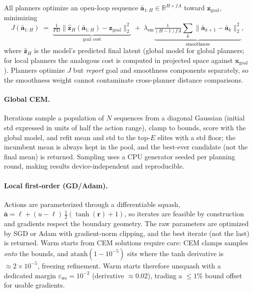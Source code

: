 \documentclass[11pt,a4paper]{article}
\newcommand{\zlat}{\mathbf{z}}
\newcommand{\xloc}{\mathbf{x}}
\newcommand{\abar}{\bar{\mathbf{a}}}
\begin{document}
All planners optimize an open-loop sequence
$\abar_{1:H} \in \mathbb{R}^{H \times fA}$ toward
$\zlat_{\mathrm{goal}}$, minimizing
\begin{equation}
J(\abar_{1:H}) \;=\;
\underbrace{\tfrac{1}{PD}\lVert \hat{\zlat}_H(\abar_{1:H}) - \zlat_{\mathrm{goal}} \rVert_2^2}_{\text{goal cost}}
\;+\; \lambda_{\mathrm{sm}}
\underbrace{\tfrac{1}{(H-1)fA}\textstyle\sum_{k} \lVert \abar_{k+1}-\abar_k \rVert_2^2}_{\text{smoothness}} ,
\label{eq:objective}
\end{equation}
where $\hat{\zlat}_H$ is the model's predicted final latent (global model for
global planners; for local planners the analogous cost is computed in
projected space against $\xloc_{\mathrm{goal}}$). Planners optimize
$J$ but \emph{report} goal and smoothness components separately, so the
smoothness weight cannot contaminate cross-planner distance comparisons.

\paragraph{Global CEM.} Iterations sample a population of $N$ sequences from a
diagonal Gaussian (initial std expressed in units of half the action range),
clamp to bounds, score with the global model, and refit mean and std to the
top-$E$ elites with a std floor; the incumbent mean is always kept in the
pool, and the best-ever candidate (not the final mean) is returned. Sampling
uses a CPU generator seeded per planning round, making results
device-independent and reproducible.

\paragraph{Local first-order (GD/Adam).} Actions are parameterized through a
differentiable squash,
$\abar = \ell + (u-\ell)\,\tfrac{1}{2}(\tanh(\mathbf{r})+1)$, so iterates are
feasible by construction and gradients respect the boundary geometry. The raw
parameters are optimized by SGD or Adam with gradient-norm clipping, and the
best iterate (not the last) is returned. Warm starts from CEM solutions
require care: CEM clamps samples \emph{onto} the bounds, and
$\mathrm{atanh}(1-10^{-5})$ sits where the tanh derivative is
${\approx}2{\times}10^{-5}$, freezing refinement. Warm starts therefore
unsquash with a dedicated margin $\varepsilon_{\mathrm{ws}}{=}10^{-2}$
(derivative ${\approx}0.02$), trading a $\le 1\%$ bound offset for usable
gradients.
\end{document}
